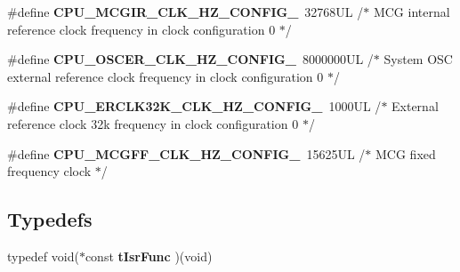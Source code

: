 \begin{DoxyCompactItemize}
\item 
\hypertarget{group___cpu__module_ga860e7441eac7d5e35385bcd62b019d9d}{\#define {\bfseries C\-P\-U\-\_\-\-M\-C\-G\-I\-R\-\_\-\-C\-L\-K\-\_\-\-H\-Z\-\_\-\-C\-O\-N\-F\-I\-G\-\_}~32768\-U\-L /$\ast$ M\-C\-G internal reference clock frequency in clock configuration 0 $\ast$/}\label{group___cpu__module_ga860e7441eac7d5e35385bcd62b019d9d}

\item 
\hypertarget{group___cpu__module_ga2960ebfe6475f475999ea8f1d5448483}{\#define {\bfseries C\-P\-U\-\_\-\-O\-S\-C\-E\-R\-\_\-\-C\-L\-K\-\_\-\-H\-Z\-\_\-\-C\-O\-N\-F\-I\-G\-\_}~8000000\-U\-L /$\ast$ System O\-S\-C external reference clock frequency in clock configuration 0 $\ast$/}\label{group___cpu__module_ga2960ebfe6475f475999ea8f1d5448483}

\item 
\hypertarget{group___cpu__module_ga092702a75fd1041eb311850abb022240}{\#define {\bfseries C\-P\-U\-\_\-\-E\-R\-C\-L\-K32\-K\-\_\-\-C\-L\-K\-\_\-\-H\-Z\-\_\-\-C\-O\-N\-F\-I\-G\-\_}~1000\-U\-L /$\ast$ External reference clock 32k frequency in clock configuration 0 $\ast$/}\label{group___cpu__module_ga092702a75fd1041eb311850abb022240}

\item 
\hypertarget{group___cpu__module_gafd8ec2ac4ea47574f95d0e5a6f80807e}{\#define {\bfseries C\-P\-U\-\_\-\-M\-C\-G\-F\-F\-\_\-\-C\-L\-K\-\_\-\-H\-Z\-\_\-\-C\-O\-N\-F\-I\-G\-\_}~15625\-U\-L /$\ast$ M\-C\-G fixed frequency clock $\ast$/}\label{group___cpu__module_gafd8ec2ac4ea47574f95d0e5a6f80807e}

\end{DoxyCompactItemize}
\subsection*{Typedefs}
\begin{DoxyCompactItemize}
\item 
\hypertarget{group___cpu__module_gabb511c0d4a17e764a053cf1b41d828e8}{typedef void($\ast$const {\bfseries t\-Isr\-Func} )(void)}\label{group___cpu__module_gabb511c0d4a17e764a053cf1b41d828e8}

\end{DoxyCompactItemize}

